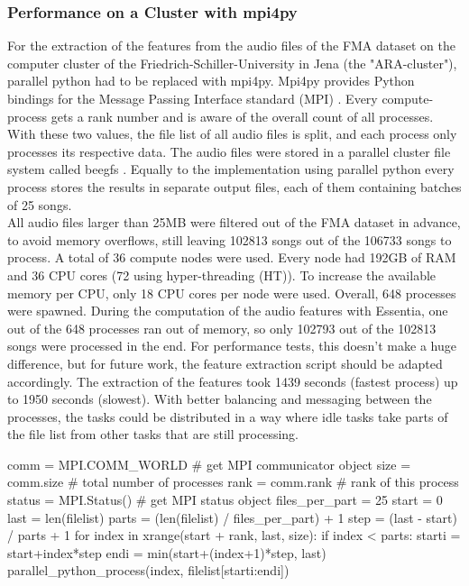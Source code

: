\subsubsection{Performance on a Cluster with mpi4py}\label{mpi4py}

For the extraction of the features from the audio files of the FMA dataset on the computer cluster of the Friedrich-Schiller-University in Jena (the "ARA-cluster"), parallel python had to be replaced with mpi4py. 
Mpi4py provides Python bindings for the Message Passing Interface standard (MPI) \cite{mpi4py}. 
Every compute-process gets a rank number and is aware of the overall count of all processes. With these two values, the file list of all audio files is split, and each process only processes its respective data. The audio files were stored in a parallel cluster file system called beegfs \cite{beegfs}. Equally to the implementation using parallel python every process stores the results in separate output files, each of them containing batches of 25 songs.\\
All audio files larger than 25MB were filtered out of the FMA dataset in advance, to avoid memory overflows, still leaving 102813 songs out of the 106733 songs to process. A total of 36 compute nodes were used. Every node had 192GB of RAM and 36 CPU cores (72 using hyper-threading (HT)). To increase the available memory per CPU, only 18 CPU cores per node were used. Overall, 648 processes were spawned. During the computation of the audio features with Essentia, one out of the 648 processes ran out of memory, so only 102793 out of the 102813 songs were processed in the end. For performance tests, this doesn't make a huge difference, but for future work, the feature extraction script should be adapted accordingly. 
The extraction of the features took 1439 seconds (fastest process) up to 1950 seconds (slowest). With better balancing and messaging between the processes, the tasks could be distributed in a way where idle tasks take parts of the file list from other tasks that are still processing. 

\begin{pythonCode}[frame=single,label={lst:mpi4py},caption={mpi4py},captionpos=b]
comm = MPI.COMM_WORLD   # get MPI communicator object
size = comm.size        # total number of processes
rank = comm.rank        # rank of this process
status = MPI.Status()   # get MPI status object
files_per_part = 25
start = 0
last = len(filelist)
parts = (len(filelist) / files_per_part) + 1
step = (last - start) / parts + 1
for index in xrange(start + rank, last, size):
    if index < parts:        
        starti = start+index*step
        endi = min(start+(index+1)*step, last)
        parallel_python_process(index, filelist[starti:endi])
\end{pythonCode}

